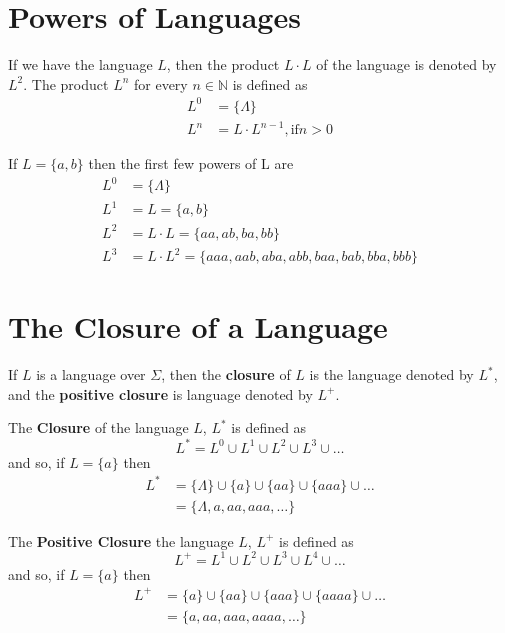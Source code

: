 \section*{Powers of Languages}

If we have the language $L$, then the product $L \cdot L$ of the language is denoted by $L^2$. The product $L^n$ for
 every $n \in \mathbb{N}$ is defined as
\begin{align*}
  L^0 &= \{\Lambda\}\\
  L^n &= L \cdot L^{n-1}, \mathrm{if} n > 0
\end{align*}

\begin{example*}{}{}
  If $L = \{a, b\}$ then the first few powers of L are
  \begin{align*}
    L^0 &= \{\Lambda\}\\
    L^1 &= L = \{a, b\}\\
    L^2 &= L \cdot L = \{aa, ab, ba, bb\}\\
    L^3 &= L \cdot L^2 = \{aaa, aab, aba, abb, baa, bab, bba, bbb\}
  \end{align*}
\end{example*}

\section*{The Closure of a Language}

If $L$ is a language over $\Sigma$, then the \textbf{closure} of $L$ is the language denoted by $L^*$, and the
 \textbf{positive closure} is language denoted by $L^+$.

\begin{definition*}{}{}
  The \textbf{Closure} of the language $L$, $L^*$ is defined as
  \begin{equation*}
    L^* = L^0 \cup L^1 \cup L^2 \cup L^3 \cup \ldots
  \end{equation*}
  and so, if $L = \{a\}$ then
  \begin{align*}
    L^* &= \{\Lambda\} \cup \{a\} \cup \{aa\} \cup \{aaa\} \cup \ldots\\
    &= \{\Lambda, a, aa, aaa, \ldots\}
  \end{align*}
\end{definition*}

\begin{definition*}{}{}
  The \textbf{Positive Closure} the language $L$, $L^+$ is defined as
  \begin{equation*}
    L^+ = L^1 \cup L^2 \cup L^3 \cup L^4 \cup \ldots
  \end{equation*}
  and so, if $L = \{a\}$ then
  \begin{align*}
    L^+ &= \{a\} \cup \{aa\} \cup \{aaa\} \cup \{aaaa\} \cup \ldots\\
    &= \{a, aa, aaa, aaaa, \ldots\}
  \end{align*}
\end{definition*}

